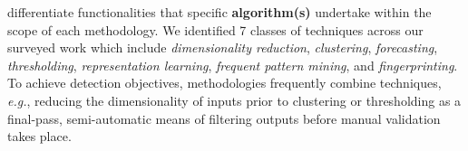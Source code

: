 \documentclass[manuscript,nonacm]{acmart}
\begin{document}
\vspace{0.25em}
 differentiate functionalities that specific \textbf{algorithm(s)} undertake within the scope of each methodology.
We identified 7 classes of techniques across our surveyed work which include \textit{dimensionality reduction}, \textit{clustering}, \textit{forecasting}, \textit{thresholding}, \textit{representation learning},
\textit{frequent pattern mining}, and \textit{fingerprinting}. 
To achieve detection objectives, methodologies frequently combine techniques, \textit{e.g.}, reducing the dimensionality of inputs prior to clustering or 
thresholding as a final-pass, semi-automatic means of filtering outputs before manual validation takes place.


\end{document}
